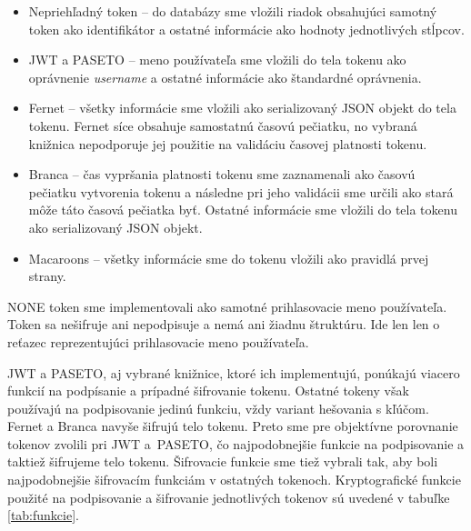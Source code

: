 \begin{itemize}
    \item Nepriehľadný token -- do databázy sme vložili riadok obsahujúci samotný token ako identifikátor a ostatné informácie ako hodnoty jednotlivých stĺpcov.
    \item JWT a PASETO -- meno používateľa sme vložili do tela tokenu ako oprávnenie \textit{username} a ostatné informácie ako štandardné oprávnenia.
    \item Fernet -- všetky informácie sme vložili ako serializovaný JSON objekt do tela tokenu. Fernet síce obsahuje samostatnú časovú pečiatku, no vybraná knižnica nepodporuje jej použitie na validáciu časovej platnosti tokenu.
    \item Branca -- čas vypršania platnosti tokenu sme zaznamenali ako časovú pečiatku vytvorenia tokenu a následne pri jeho validácii sme určili ako stará môže táto časová pečiatka byť. Ostatné informácie sme vložili do tela tokenu ako serializovaný JSON objekt.
    \item Macaroons -- všetky informácie sme do tokenu vložili ako pravidlá prvej strany.
\end{itemize}

NONE token sme implementovali ako samotné prihlasovacie meno používateľa. Token sa nešifruje ani nepodpisuje a nemá ani žiadnu štruktúru. Ide len len o reťazec reprezentujúci prihlasovacie meno používateľa.

JWT a PASETO, aj vybrané knižnice, ktoré ich implementujú, ponúkajú viacero funkcií na podpísanie a prípadné šifrovanie tokenu. Ostatné tokeny však používajú na podpisovanie jedinú funkciu, vždy variant hešovania s kľúčom. Fernet a Branca navyše šifrujú telo tokenu. Preto sme pre objektívne porovnanie tokenov zvolili pri JWT a~PASETO, čo najpodobnejšie funkcie na podpisovanie a taktiež šifrujeme telo tokenu. Šifrovacie funkcie sme tiež vybrali tak, aby boli najpodobnejšie šifrovacím funkciám v ostatných tokenoch. Kryptografické funkcie použité na podpisovanie a šifrovanie jednotlivých tokenov sú uvedené v tabuľke \ref{tab:funkcie}.

\begin{table}[H]
  \begin{center}
    \caption{Kryptografické funkcie na podpisovanie a šifrovanie tokenov}
    \label{tab:funkcie} %

  \end{center}
\end{table}


